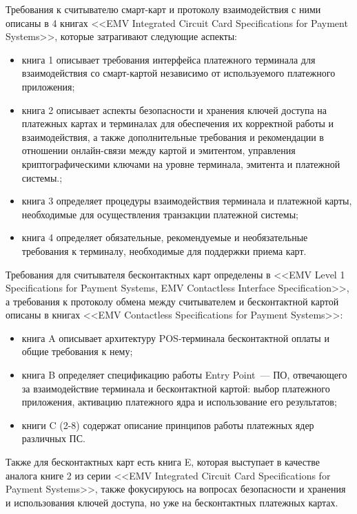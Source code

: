 Требования к считывателю смарт-карт и протоколу взаимодействия с ними описаны в 4 книгах <<EMV Integrated Circuit Card Specifications for Payment Systems>>, которые затрагивают следующие аспекты:
\begin{itemize}
    \item книга 1 описывает требования интерфейса платежного терминала для взаимодействия со смарт-картой независимо от используемого платежного приложения;
    \item книга 2 описывает аспекты безопасности и хранения ключей доступа на платежных картах и терминалах для обеспечения их корректной работы и взаимодействия, а также дополнительные требования и рекомендации в отношении онлайн-связи между картой и эмитентом, управления
    криптографическими ключами на уровне терминала, эмитента и платежной системы.;
    \item книга 3 определяет процедуры взаимодействия терминала и платежной карты, необходимые для осуществления транзакции платежной системы;
    \item книга 4 определяет обязательные, рекомендуемые и необязательные требования к терминалу, необходимые для поддержки приема карт.
\end{itemize}

Требования для считывателя бесконтактных карт определены в <<EMV Level 1 Specifications for Payment Systems, EMV Contactless Interface Specification>>, а требования к протоколу обмена между считывателем и бесконтактной картой описаны в книгах <<EMV Contactless Specifications for Payment Systems>>:
\begin{itemize}
    \item книга A описывает архитектуру POS-терминала бесконтактной оплаты и общие требования к нему;
    \item книга B определяет спецификацию работы Entry Point~--- ПО, отвечающего за взаимодействие терминала и бесконтактной картой: выбор платежного приложения, активацию платежного ядра и использование его результатов;
    \item книги C (2-8) содержат описание принципов работы платежных ядер различных ПС.
\end{itemize}

Также для бесконтактных карт есть книга E, которая выступает в качестве аналога книге 2 из серии <<EMV Integrated Circuit Card Specifications for Payment Systems>>, также фокусируюсь на вопросах безопасности и хранения и использования ключей доступа, но уже на бесконтактных платежных картах.



